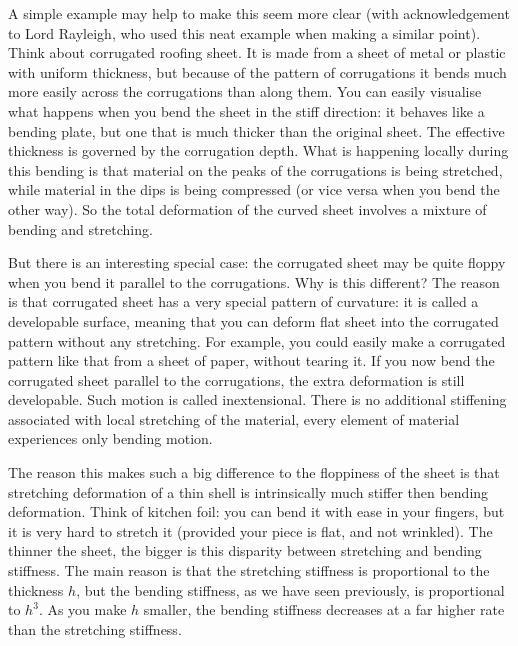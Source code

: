  A simple example may help to make this seem more clear (with acknowledgement 
  to Lord Rayleigh, who used this neat example when making a similar point). 
  Think about corrugated roofing sheet. It is made from a sheet of metal or 
  plastic with uniform thickness, but because of the pattern of corrugations it 
  bends much more easily across the corrugations than along them. You can 
  easily visualise what happens when you bend the sheet in the stiff direction: 
  it behaves like a bending plate, but one that is much thicker than the 
  original sheet. The effective thickness is governed by the corrugation depth. 
  What is happening locally during this bending is that material on the peaks 
  of the corrugations is being stretched, while material in the dips is being 
  compressed (or vice versa when you bend the other way). So the total 
  deformation of the curved sheet involves a mixture of bending and stretching. 

  But there is an interesting special case: the corrugated sheet may be quite 
  floppy when you bend it parallel to the corrugations. Why is this different? 
  The reason is that corrugated sheet has a very special pattern of curvature: 
  it is called a developable surface, meaning that you can deform flat sheet 
  into the corrugated pattern without any stretching. For example, you could 
  easily make a corrugated pattern like that from a sheet of paper, without 
  tearing it. If you now bend the corrugated sheet parallel to the 
  corrugations, the extra deformation is still developable. Such motion is 
  called inextensional. There is no additional stiffening associated with local 
  stretching of the material, every element of material experiences only 
  bending motion. 

  The reason this makes such a big difference to the floppiness of the sheet is 
  that stretching deformation of a thin shell is intrinsically much stiffer 
  then bending deformation. Think of kitchen foil: you can bend it with ease in 
  your fingers, but it is very hard to stretch it (provided your piece is flat, 
  and not wrinkled). The thinner the sheet, the bigger is this disparity 
  between stretching and bending stiffness. The main reason is that the 
  stretching stiffness is proportional to the thickness $h$, but the bending 
  stiffness, as we have seen previously, is proportional to $h^3$. As you make 
  $h$ smaller, the bending stiffness decreases at a far higher rate than the 
  stretching stiffness. 

